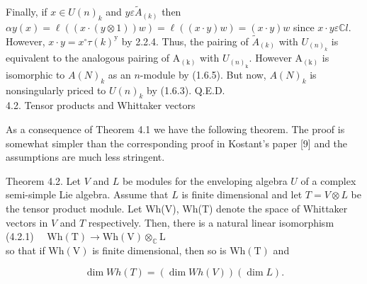 \documentclass[10pt]{article}
\begin{document}
Finally, if $x \in U(n)_{k}$ and $y \varepsilon \tilde{A}_{(k)}$ then $\alpha y(x)=\ell((x \cdot(y \otimes 1)) w)=\ell((x \cdot y) w)=(x \cdot y) w$ since $x \cdot y \varepsilon \mathbb{C} l$. However, $x \cdot y=x^{\circ} \tau(k)^{\mathrm{y}}$ by 2.2.4. Thus, the pairing of $\tilde{A}_{(k)}$ with $U_{(n)_{k}}$ is equivalent to the analogous pairing of $\mathrm{A}_{(\mathrm{k})}$ with $U_{(n)_{\mathrm{k}}}$. However $\mathrm{A}_{(\mathrm{k})}$ is isomorphic to $A(N)_{k}$ as an $n$-module by (1.6.5). But now, $A(N)_{k}$ is nonsingularly priced to $U(n)_{k}$ by (1.6.3). Q.E.D.\\
4.2. Tensor products and Whittaker vectors

As a consequence of Theorem 4.1 we have the following theorem. The proof is somewhat simpler than the corresponding proof in Kostant's paper [9] and the assumptions are much less stringent.

Theorem 4.2. Let $V$ and $L$ be modules for the enveloping algebra $U$ of a complex semi-simple Lie algebra. Assume that $L$ is finite dimensional and let $T=V \otimes L$ be the tensor product module. Let Wh(V), Wh(T) denote the space of Whittaker vectors in $V$ and $T$ respectively. Then, there is a natural linear isomorphism\\
(4.2.1) $\quad \mathrm{Wh}(\mathrm{T}) \rightarrow \mathrm{Wh}(\mathrm{V}) \otimes_{\mathbb{C}} \mathrm{L}$\\
so that if $\mathrm{Wh}(\mathrm{V})$ is finite dimensional, then so is $\mathrm{Wh}(\mathrm{T})$ and


\begin{equation*}
\operatorname{dim} W h(T)=(\operatorname{dim} W h(V))(\operatorname{dim} L) . \tag{4.2.2}
\end{equation*}
\end{document}

